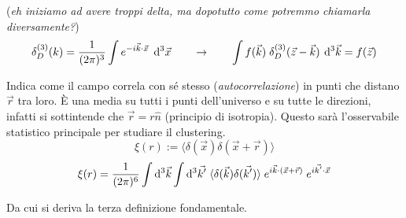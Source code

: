 \vspace{3em}
\begin{example}
    (\textit{eh iniziamo ad avere troppi delta, ma dopotutto come potremmo chiamarla diversamente?})
    \begin{equation}
        \delta_D^{(3)}(k)= \frac{1}{(2\pi)^3} \int e^{-i\vec{k}\cdot\vec{x}}\; \operatorname{d}\!{^3 \vec{x}}\qquad \rightarrow\qquad \int f(\vec{k})\; \delta_D^{(3)}( \vec{z}-\vec{k} )\:\operatorname{d}\!{^3 \vec{k}}= f(\vec{z})
    \end{equation}
\end{example}

\begin{example}
    Indica come il campo correla con sé stesso (\textit{autocorrelazione}) in punti che distano $\vec{r}$ tra loro. È una media su tutti i punti dell'universo e su tutte le direzioni, infatti si sottintende che $\vec{r}=r\hat{n}$ (principio di isotropia). Questo sarà l'osservabile statistico principale per studiare il clustering.
    \begin{equation}
        \xi (r) := \langle\delta (\vec{x}) \delta(\vec{x}+\vec{r}) \rangle 
    \end{equation}
    \begin{equation}
        \xi (r)= \frac{1}{(2\pi)^6}\int \operatorname{d}\!{^3\vec{k}}\int \operatorname{d}\!{^3\vec{k'}}\; \langle \delta (\vec{k}) \delta(\vec{k'})\rangle \; e^{i\vec{k}\cdot(\vec{x}+\vec{r})}\; e^{i\vec{k'}\cdot \vec{x}}\label{eq:8xi}
    \end{equation}
\end{example}
Da cui si deriva la terza definizione fondamentale.

